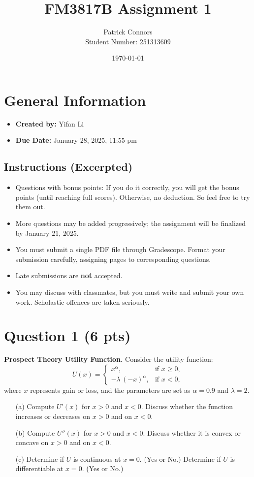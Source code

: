 \documentclass[12pt]{article}
\title{FM3817B Assignment 1}
\author{Patrick Connors \\ Student Number: 251313609}
\date{\today}
\begin{document}
\maketitle

\section*{General Information}
\begin{itemize}
    \item \textbf{Created by:} Yifan Li
    \item \textbf{Due Date:} January 28, 2025, 11:55 pm
\end{itemize}

\subsection*{Instructions (Excerpted)}
\begin{itemize}
    \item Questions with bonus points: If you do it correctly, you will get the bonus points (until reaching full scores). Otherwise, no deduction. So feel free to try them out.
    \item More questions may be added progressively; the assignment will be finalized by January 21, 2025.
    \item You must submit a single PDF file through Gradescope. Format your submission carefully, assigning pages to corresponding questions.
    \item Late submissions are \textbf{not} accepted.
    \item You may discuss with classmates, but you must write and submit your own work. Scholastic offences are taken seriously.
\end{itemize}

\section*{Question 1 (6 pts)}
\textbf{Prospect Theory Utility Function.} Consider the utility function:
\[
U(x) = 
\begin{cases} 
x^\alpha, & \text{if } x \ge 0,\\
-\lambda \,(-x)^\alpha, & \text{if } x < 0,
\end{cases}
\]
where \(x\) represents gain or loss, and the parameters are set as \(\alpha = 0.9\) and \(\lambda = 2\).

\begin{enumerate}
    \item[(a)] Compute \(U'(x)\) for \(x > 0\) and \(x < 0\). Discuss whether the function increases or decreases on \(x > 0\) and on \(x < 0\).

    \item[(b)] Compute \(U''(x)\) for \(x > 0\) and \(x < 0\). Discuss whether it is convex or concave on \(x > 0\) and on \(x < 0\).

    \item[(c)] Determine if \(U\) is continuous at \(x = 0\). (Yes or No.) Determine if \(U\) is differentiable at \(x = 0\). (Yes or No.)
\end{enumerate}
\end{document}
